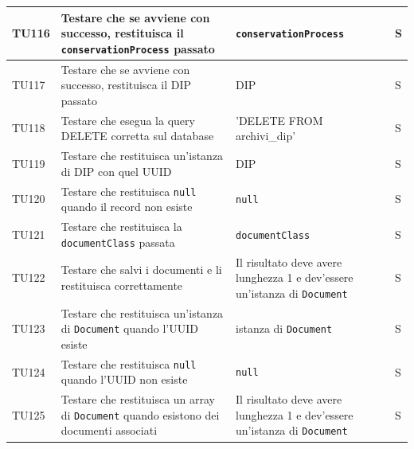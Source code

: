 \documentclass[a4paper,12pt]{article}
\begin{document}
\begin{longtable}{|M{1.2cm}|M{5cm}|M{8cm}|M{1.5cm}|}

            TU116 & Testare che se \texttt{} avviene con successo, restituisca il \texttt{conservationProcess} passato & \texttt{conservationProcess} & S \\
            \hline

            TU117 & Testare che se \texttt{} avviene con successo, restituisca il DIP passato & DIP & S \\
            \hline

            TU118 & Testare che \texttt{} esegua la query DELETE corretta sul database & 'DELETE FROM archivi\_dip' & S \\
            \hline

            TU119 & Testare che \texttt{} restituisca un'istanza di DIP con quel UUID & DIP & S \\
            \hline

            TU120 & Testare che \texttt{} restituisca \texttt{null} quando il record non esiste & \texttt{null} & S \\
            \hline

            TU121 & Testare che \texttt{} restituisca la \texttt{documentClass} passata & \texttt{documentClass} & S \\
            \hline

            TU122 & Testare che \texttt{} salvi i documenti e li restituisca correttamente & Il risultato deve avere lunghezza 1 e dev'essere un'istanza di \texttt{Document} & S \\
            \hline

            TU123 & Testare che \texttt{} restituisca un'istanza di \texttt{Document} quando l'UUID esiste & istanza di \texttt{Document} & S \\
            \hline

            TU124 & Testare che \texttt{} restituisca \texttt{null} quando l'UUID non esiste & \texttt{null} & S \\
            \hline

            TU125 & Testare che \texttt{} restituisca un array di \texttt{Document} quando esistono dei documenti associati & Il risultato deve avere lunghezza 1 e dev'essere un'istanza di \texttt{Document} & S \\
            \hline


\end{longtable}
\end{document}
